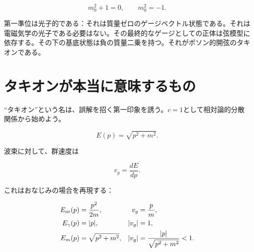 \begin{equation}
  m_0^2+1=0,
  \qquad
  m_0^2=-1.
  \label{eq:l03-intercept-condition}
\end{equation}

第一準位は光子的である：それは質量ゼロのゲージベクトル状態である。それは電磁気学の光子である必要はない。その最終的なゲージとしての正体は弦模型に依存する。その下の基底状態は負の質量二乗を持つ。それがボソン的開弦のタキオンである。

\begin{classroomqa}
\end{classroomqa}

\section{タキオンが本当に意味するもの}

``タキオン''という名は、誤解を招く第一印象を誘う。\(c=1\)として相対論的分散関係から始めよう。

\begin{equation}
  E(p)=\sqrt{p^2+m^2}.
  \label{eq:l03-relativistic-dispersion}
\end{equation}

波束に対して、群速度は

\begin{equation}
  v_g=\frac{dE}{dp}.
  \label{eq:l03-group-velocity}
\end{equation}

これはおなじみの場合を再現する：

\begin{align}
  E_{\rm nr}(p)&=\frac{p^2}{2m},
  &v_g&=\frac{p}{m},
  \label{eq:l03-nr-group-velocity}\\
  E_\gamma(p)&=|p|,
  &|v_g|&=1,
  \label{eq:l03-photon-group-velocity}\\
  E_m(p)&=\sqrt{p^2+m^2},
  &|v_g|&=\frac{|p|}{\sqrt{p^2+m^2}}<1.
  \label{eq:l03-massive-group-velocity}
\end{align}

